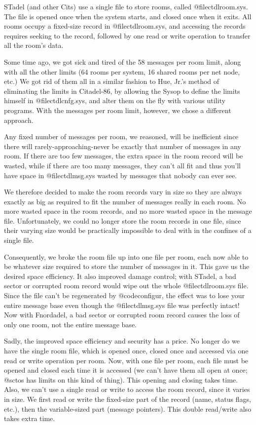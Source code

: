 {{{STadel (and other Cits) use a single file to store rooms, called
@file{ctdlroom.sys}.  The file is opened once when the system starts, and closed once
when it exits.  All rooms occupy a fixed-size record in @file{ctdlroom.sys}, and
accessing the records requires seeking to the record, followed by one read or
write operation to transfer all the room's data.

Some time ago, we got sick and tired of the 58 messages per room limit,
along with all the other limits (64 rooms per system, 16 shared rooms per net
node, etc.)  We got rid of them all in a similar fashion to Hue, Jr.'s method
of eliminating the limits in Citadel-86, by allowing the Sysop to define the
limits himself in @file{ctdlcnfg.sys}, and alter them on the fly with various
utility programs.  With the messages per room limit, however, we chose a
different approach.

Any fixed number of messages per room, we reasoned, will be inefficient
since there will rarely-approaching-never be exactly that number of messages
in any room.  If there are too few messages, the extra space in the room
record will be wasted, while if there are too many messages, they can't all
fit and thus you'll have space in @file{ctdlmsg.sys} wasted by messages that
nobody can ever see.

We therefore decided to make the room records vary in size so they are
always exactly as big as required to fit the number of messages really in each
room.  No more wasted space in the room records, and no more wasted space in
the message file.  Unfortunately, we could no longer store the room records in
one file, since their varying size would be practically impossible to deal
with in the confines of a single file.

Consequently, we broke the room file up into one file per room, each
now able to be whatever size required to store the number of messages in it.
This gave us the desired space efficiency.  It also improved damage control;
with STadel, a bad sector or corrupted room record would wipe out the whole
@file{ctdlroom.sys} file.  Since the file can't be regenerated by
@code{configur}, the
effect was to lose your entire message base even though the @file{ctdlmsg.sys} file
was perfectly intact!  Now with Fnordadel, a bad sector or corrupted room
record causes the loss of only one room, not the entire message base.

Sadly, the improved space efficiency and security has a price.  No
longer do we have the single room file, which is opened once, closed once and
accessed via one read or write operation per room.  Now, with one file per
room, each file must be opened and closed each time it is accessed (we can't
have them all open at once; @sc{tos} has limits on this kind of thing).  This
opening and closing takes time.  Also, we can't use a single read or write to
access the room record, since it varies in size.  We first read or write the
fixed-size part of the record (name, status flags, etc.), then the variable-sized
part (message pointers).  This double read/write also takes extra time.

}}}
